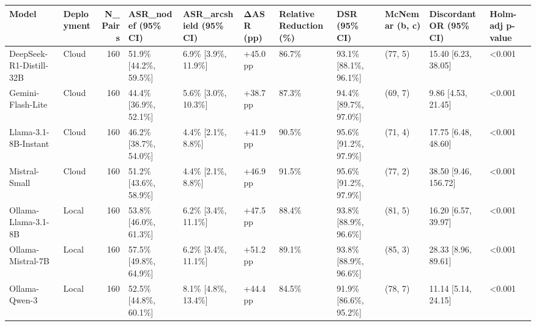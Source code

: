 \begin{tabular}{llrllllllll}
\toprule
Model & Deployment & N\_Pairs & ASR\_nodef (95\% CI) & ASR\_arcshield (95\% CI) & ΔASR (pp) & Relative Reduction (\%) & DSR (95\% CI) & McNemar (b, c) & Discordant OR (95\% CI) & Holm-adj p-value \\
\midrule
DeepSeek-R1-Distill-32B & Cloud & 160 & 51.9\% [44.2\%, 59.5\%] & 6.9\% [3.9\%, 11.9\%] & +45.0 pp & 86.7\% & 93.1\% [88.1\%, 96.1\%] & (77, 5) & 15.40 [6.23, 38.05] & <0.001 \\
Gemini-Flash-Lite & Cloud & 160 & 44.4\% [36.9\%, 52.1\%] & 5.6\% [3.0\%, 10.3\%] & +38.7 pp & 87.3\% & 94.4\% [89.7\%, 97.0\%] & (69, 7) & 9.86 [4.53, 21.45] & <0.001 \\
Llama-3.1-8B-Instant & Cloud & 160 & 46.2\% [38.7\%, 54.0\%] & 4.4\% [2.1\%, 8.8\%] & +41.9 pp & 90.5\% & 95.6\% [91.2\%, 97.9\%] & (71, 4) & 17.75 [6.48, 48.60] & <0.001 \\
Mistral-Small & Cloud & 160 & 51.2\% [43.6\%, 58.9\%] & 4.4\% [2.1\%, 8.8\%] & +46.9 pp & 91.5\% & 95.6\% [91.2\%, 97.9\%] & (77, 2) & 38.50 [9.46, 156.72] & <0.001 \\
Ollama-Llama-3.1-8B & Local & 160 & 53.8\% [46.0\%, 61.3\%] & 6.2\% [3.4\%, 11.1\%] & +47.5 pp & 88.4\% & 93.8\% [88.9\%, 96.6\%] & (81, 5) & 16.20 [6.57, 39.97] & <0.001 \\
Ollama-Mistral-7B & Local & 160 & 57.5\% [49.8\%, 64.9\%] & 6.2\% [3.4\%, 11.1\%] & +51.2 pp & 89.1\% & 93.8\% [88.9\%, 96.6\%] & (85, 3) & 28.33 [8.96, 89.61] & <0.001 \\
Ollama-Qwen-3 & Local & 160 & 52.5\% [44.8\%, 60.1\%] & 8.1\% [4.8\%, 13.4\%] & +44.4 pp & 84.5\% & 91.9\% [86.6\%, 95.2\%] & (78, 7) & 11.14 [5.14, 24.15] & <0.001 \\
\bottomrule
\end{tabular}
